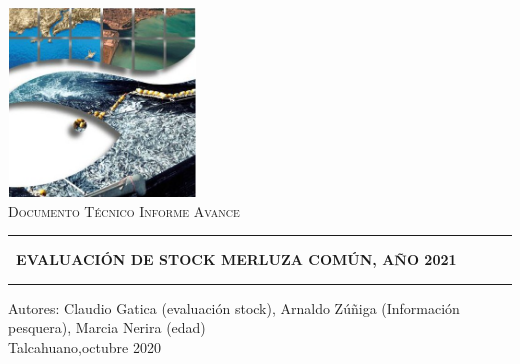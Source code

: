 \begin{titlepage}

\newcommand{\HRule}{\rule{\linewidth}{0.5mm}} %

\center %


\begin{minipage}{14cm}
\center

\includegraphics[width=5cm,height=5cm]{logo}\\[0.5cm] %


\textsc{\LARGE  Documento Técnico Informe Avance}\\[2.3cm] 




\hrule
\begin{center}
\vspace{0.5cm}
\Large\bf\ EVALUACIÓN DE STOCK MERLUZA COMÚN, AÑO 2021
\vspace{0.5cm}
\end{center}
\hrule


\vspace{5cm}
{\Large
Autores: Claudio Gatica (evaluación stock), Arnaldo Zúñiga (Información pesquera), Marcia Nerira (edad)} \\[0.5cm]
{\large
Talcahuano,octubre 2020
}


\end{minipage}

\vfill %

\cleardoublepage
\thispagestyle{empty}
\end{titlepage}

\raggedbottom

